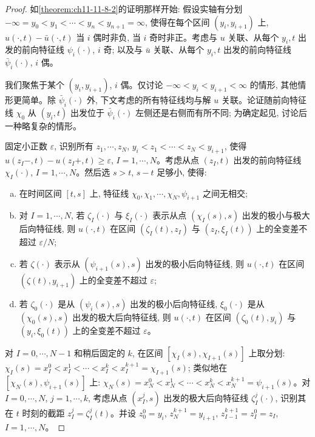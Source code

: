 \documentclass[../../main.tex]{subfiles}
\begin{document}
\begin{proof}
如\cref{theorem:ch11-11-8-2}的证明那样开始: 假设实轴有分划 $-\infty=y_0<y_1<\cdots<y_n<y_{n+1}=\infty$, 使得在每个区间 $(y_i,y_{i+1})$ 上, $u(\cdot,t)-\bar u(\cdot,t)$ 当 $i$ 偶时非负, 当 $i$ 奇时非正。考虑与 $u$ 关联、从每个 $y_i,t$ 出发的前向特征线 $\psi_i(\cdot)$, $i$ 奇; 以及与 $\bar u$ 关联、从每个 $y_i,t$ 出发的前向特征线 $\bar\psi_i(\cdot)$, $i$ 偶。

我们聚焦于某个 $(y_i,y_{i+1})$, $i$ 偶。仅讨论 $-\infty<y_i<y_{i+1}<\infty$ 的情形, 其他情形更简单。除 $\bar\psi_i(\cdot)$ 外, 下文考虑的所有特征线均与解 $u$ 关联。论证随前向特征线 $\chi_0$ 从 $(y_i,t)$ 出发位于 $\bar\psi_i(\cdot)$ 左侧还是右侧而有所不同; 为确定起见, 讨论后一种略复杂的情形。

固定小正数 $\varepsilon$, 识别所有 $z_1,\cdots,z_N$, $y_i<z_1<\cdots<z_N<y_{i+1}$, 使得 $u(z_I-,t)-u(z_I+,t)\geqslant\varepsilon$, $I=1,\cdots,N$。考虑从点 $(z_I,t)$ 出发的前向特征线 $\chi_I(\cdot)$, $I=1,\cdots,N$。然后选 $s>t$, $s-t$ 足够小, 使得:
\begin{enumerate}[(a)]
\item 在时间区间 $[t,s]$ 上, 特征线 $\chi_0,\chi_1,\cdots,\chi_N,\psi_{i+1}$ 之间无相交;
\item 对 $I=1,\cdots,N$, 若 $\zeta_I(\cdot)$ 与 $\xi_I(\cdot)$ 表示从点 $(\chi_I(s),s)$ 出发的极小与极大后向特征线, 则 $u(\cdot,t)$ 在区间 $(\zeta_I(t),z_I)$ 与 $(z_I,\xi_I(t))$ 上的全变差不超过 $\varepsilon/N$;
\item 若 $\zeta(\cdot)$ 表示从 $(\psi_{i+1}(s),s)$ 出发的极小后向特征线, 则 $u(\cdot,t)$ 在区间 $(\zeta(t),y_{i+1})$ 上的全变差不超过 $\varepsilon$;
\item 若 $\zeta_0(\cdot)$ 是从 $(\psi_i(s),s)$ 出发的极小后向特征线, $\xi_0(\cdot)$ 是从 $(\chi_0(s),s)$ 出发的极大后向特征线, 则 $u(\cdot,t)$ 在区间 $(\zeta_0(t),y_i)$ 与 $(y_i,\xi_0(t))$ 上的全变差不超过 $\varepsilon$。
\end{enumerate}

对 $I=0,\cdots,N-1$ 和稍后固定的 $k$, 在区间 $[\chi_I(s),\chi_{I+1}(s)]$ 上取分划: $\chi_I(s)=x_I^0<x_I^1<\cdots<x_I^k<x_I^{k+1}=\chi_{I+1}(s)$; 类似地在 $[\chi_N(s),\psi_{i+1}(s)]$ 上: $\chi_N(s)=x_N^0<x_N^1<\cdots<x_N^k<x_N^{k+1}=\psi_{i+1}(s)$。对 $I=0,\cdots,N$, $j=1,\cdots,k$, 考虑从点 $(x_I^j,s)$ 出发的极大后向特征线 $\zeta_I^j(\cdot)$, 识别其在 $t$ 时刻的截距 $z_I^j=\zeta_I^j(t)$。并设 $z_0^0=y_i$, $z_N^{k+1}=y_{i+1}$, $z_{I-1}^{k+1}=z_I^0=z_I$, $I=1,\cdots,N$。


\end{proof}
\end{document}
